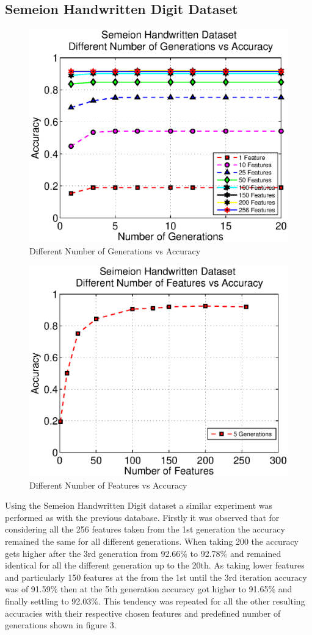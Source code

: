 \documentclass[11pt,onecolumn,a4paper]{article}
\begin{document}
\subsection{Semeion Handwritten Digit Dataset}

    \begin{figure}[ht!]
      \centering
      \includegraphics[width=0.6\linewidth]{img/seimfeat.eps}
      \caption{Different Number of Generations vs Accuracy}
    \end{figure}
    \begin{figure}[h!]
          \centering
          \includegraphics[width=0.6\linewidth]{img/seimfeat2.eps}
          \caption{Different Number of Features vs Accuracy}
    \end{figure}
        
Using the Semeion Handwritten Digit dataset a similar experiment was performed as with the previous database. Firstly it was observed that for considering all the 256 features taken from the 1st generation the accuracy remained the same for all different generations. When taking 200 the accuracy gets higher after the 3rd generation from 92.66\% to 92.78\% and remained identical for all the different generation up to the 20th. As taking lower features and particularly 150 features at the from the 1st until the 3rd iteration accuracy was of 91.59\% then at the 5th generation accuracy got higher to 91.65\% and finally settling to 92.03\%. This tendency was repeated for all the other resulting accuracies with their respective chosen features and predefined number of generations shown in figure 3. 
\end{document}
